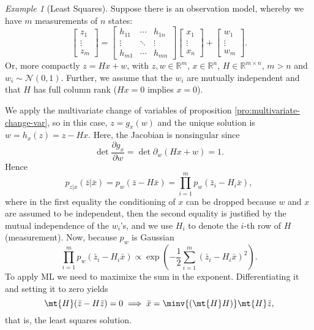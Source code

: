 \documentclass[margin=small]{hsrzf}
\theoremstyle{plain}
\theoremstyle{definition}
\theoremstyle{remark}
\newtheorem*{example}{Example}
\begin{document}
\begin{example}[Least Squares]
  Suppose there is an observation model, whereby we have $m$ measurements of
  $n$ states:
  \[
    \begin{bmatrix} z_1 \\ \vdots \\ z_m \end{bmatrix}
    = \begin{bmatrix}
        h_{11} & \cdots & h_{1n} \\
        \vdots & \ddots & \vdots \\
        h_{m1} & \cdots & h_{mn}
    \end{bmatrix}
    \begin{bmatrix} x_1 \\ \vdots \\ x_n \end{bmatrix}
    + \begin{bmatrix} w_1 \\ \vdots \\ w_m \end{bmatrix}.
  \]
  Or, more compactly $z = Hx + w$, with $z,w \in \mathbb{R}^m$, $x \in
  \mathbb{R}^n$, $H \in \mathbb{R}^{m\times n}$, $m > n$ and $w_i \sim
  \mathcal{N}(0,1)$. Further, we assume that the $w_i$ are mutually
  independent and that $H$ has full column rank ($Hx = 0$ implies $x=0$).

  We apply the multivariate change of variables of proposition
  \ref{pro:multivariate-change-var}, so in this case, $z = g_x(w)$ and the
  unique solution is $w = h_x(z) = z - Hx$. Here, the Jacobian is
  nonsingular since
  \[
    \det \frac{\partial g_x}{\partial w} = 
    \det \partial_w \left(Hx + w\right) = 1.
  \]
  Hence
  \[
    p_{z|x}(\bar{z} | \bar{x})
      = p_w(\bar{z} - H\bar{x})
      = \prod_{i=1}^m p_w(\bar{z}_i - H_i\bar{x}),
  \]
  where in the first equality the conditioning of $x$ can be dropped because
  $w$ and $x$ are assumed to be independent, then the second equality is
  justified by the mutual independence of the $w_i$'s, and we use $H_i$ to
  denote the $i$-th row of $H$ (measurement).
  Now, because $p_w$ is Gaussian
  \[
      \prod_{i=1}^m p_w(\bar{z}_i - H_i\bar{x})
      \propto \exp \left(
        -\frac{1}{2} \sum_{i=1}^m (\bar{z}_i - H_i \bar{x})^2
      \right).
  \]
  To apply ML we need to maximixe the sum in the exponent. Differentiating it
  and setting it to zero yields
  \[
    \mt{H}(\bar{z} - H\bar{z}) = 0 \implies
      \bar{x} = \minv{(\mt{H} H)} \mt{H} \bar{z},
  \]
  that is, the least squares solution.
\end{example}
\end{document}
